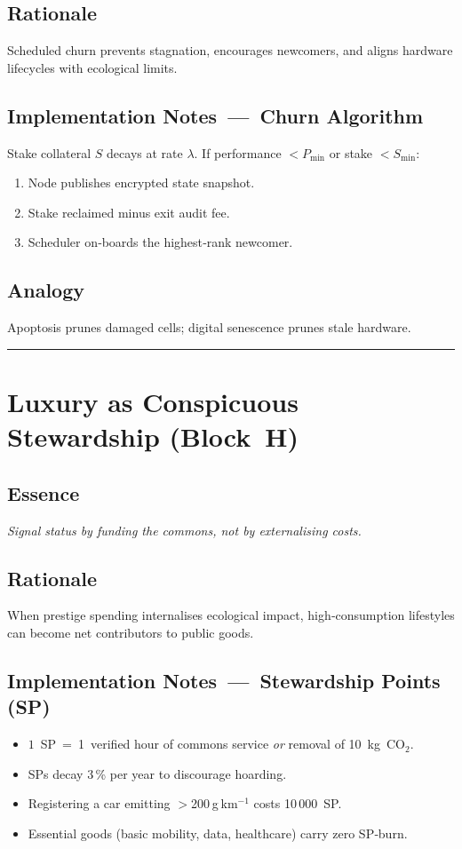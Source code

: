 \subsection*{Rationale}
Scheduled churn prevents stagnation, encourages newcomers, and aligns hardware lifecycles with ecological limits.

\subsection*{Implementation Notes — Churn Algorithm}
Stake collateral $S$ decays at rate $\lambda$. If performance $<P_{\min}$ or stake $<S_{\min}$:
\begin{enumerate}
  \item Node publishes encrypted state snapshot.
  \item Stake reclaimed minus exit audit fee.
  \item Scheduler on‑boards the highest‑rank newcomer.
\end{enumerate}

\subsection*{Analogy}
Apoptosis prunes damaged cells; digital senescence prunes stale hardware.

\bigskip\hrule\bigskip

\section{Luxury as Conspicuous Stewardship (Block H)}
\subsection*{Essence}
\emph{Signal status by funding the commons, not by externalising costs.}

\subsection*{Rationale}
When prestige spending internalises ecological impact, high‑consumption lifestyles can become net contributors to public goods.

\subsection*{Implementation Notes — Stewardship Points (SP)}
\begin{itemize}
  \item $1$ SP = 1 verified hour of commons service \textit{or} removal of 10 kg CO$_2$.
  \item SPs decay 3\,\% per year to discourage hoarding.
  \item Registering a car emitting $>$200 g km$^{-1}$ costs 10 000 SP.
  \item Essential goods (basic mobility, data, healthcare) carry zero SP‑burn.
\end{itemize}

